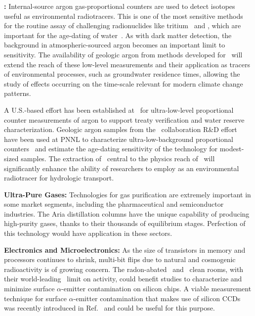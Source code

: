 \begin{asparaenum}
\item[\bf \ce{^39Ar}:] Internal-source argon gas-proportional counters are used to detect isotopes useful as environmental radiotracers. This is one of the most sensitive methods for the routine assay of challenging radionuclides like tritium~\cite{Theodorsson:1999dn} and , which are important for the age-dating of water~\cite{Martoff:1992bg}.  As with dark matter detection, the  background in atmospheric-sourced argon becomes an important limit to sensitivity.  The availability of geologic argon from methods developed for \DS\ will extend the reach of these low-level measurements and their application as tracers of environmental processes, such as groundwater residence times, allowing the study of effects occurring on the time-scale relevant for modern climate change patterns.

A U.S.-based effort has been established at \PNNL\ for ultra-low-level proportional counter measurements of argon to support treaty verification and water reserve characterization. Geologic argon samples from the \DS\ collaboration R\&D effort have been used at PNNL to characterize ultra-low-background proportional counters~\cite{Aalseth:2009je,Seifert:2012ip} and estimate the age-dating sensitivity of the technology for modest-sized samples.  The extraction of \UAr\ central to the physics reach of \DSk\ will significantly enhance the ability of researchers to employ  as an environmental radiotracer for hydrologic transport.
 
\item[\bf Ultra-Pure Gases:] Technologies for gas purification are extremely important in some market segments, including the pharmaceutical and semiconductor industries.  The Aria distillation columns have the unique capability of producing high-purity gases, thanks to their thousands of equilibrium stages.  Perfection of this technology would have application in these sectors.

\item[\bf Electronics and Microelectronics:] As the size of transistors in memory and processors continues to shrink, multi-bit flips due to natural and cosmogenic radioactivity is of growing concern.  The radon-abated \CROne\ and \CRH\ clean rooms, with their world-leading \RadonCRHLimit\ limit on  activity, could benefit studies to characterize and minimize surface $\alpha$-emitter contamination on silicon chips.  A viable measurement technique for surface $\alpha$-emitter contamination that makes use of silicon CCDs was recently introduced in Ref.~\cite{AguilarArevalo:2015hf} and could be useful for this purpose.


\end{asparaenum}

